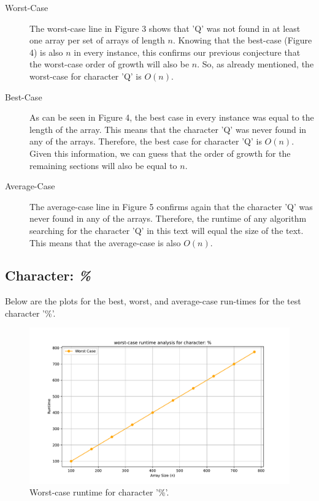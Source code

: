 \documentclass{article}
\begin{document}
\begin{description}
    \item[Worst-Case] The worst-case line in Figure 3 shows that 'Q' was not found in at least one array per set of arrays of length $n$. Knowing that the best-case (Figure 4) is also $n$ in every instance, this confirms our previous conjecture that the worst-case order of growth will also be $n$. So, as already mentioned, the worst-case for character 'Q' is $O(n)$.
    \item[Best-Case] As can be seen in Figure 4, the best case in every instance was equal to the length of the array. This means that the character 'Q' was never found in any of the arrays. Therefore, the best case for character 'Q' is $O(n)$. Given this information, we can guess that the order of growth for the remaining sections will also be equal to $n$.
    \item[Average-Case] The average-case line in Figure 5 confirms again that the character 'Q' was never found in any of the arrays. Therefore, the runtime of any algorithm searching for the character 'Q' in this text will equal the size of the text. This means that the average-case is also $O(n)$.
\end{description}

\subsection{Character: \textit{\%}}
Below are the plots for the best, worst, and average-case run-times for the test character '\%'.

	\begin{figure}[H]
		\centering
		\includegraphics[width=\textwidth]{runtime_analysis_worst_pcnt.pdf}
		\caption{Worst-case runtime for character '\%'.}
	\end{figure}
\end{document}

